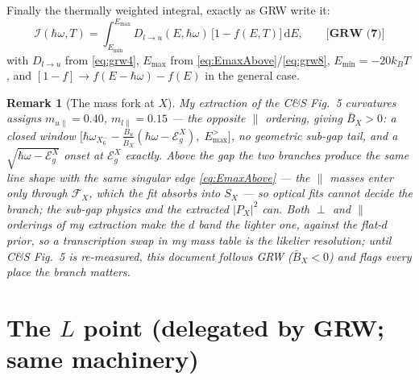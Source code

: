 \documentclass[11pt,a4paper]{article}
\numberwithin{equation}{section}
\newcommand{\hw}{\hbar\omega}
\newcommand{\EgX}{\mathcal{E}_g^{X}}
\newcommand{\cF}{\mathcal{F}}
\newcommand{\cI}{\mathcal{I}}
\newcommand{\BX}{\bar{B}_X}
\newcommand{\dd}{\mathrm{d}}
\newcommand{\wXsix}{\hbar\omega_{X_6^-}}
\newcommand{\grweq}[1]{\textbf{[GRW~(#1)]}}
\newtheorem{remark}{Remark}[section]
\begin{document}
Finally the thermally weighted integral, exactly as GRW write it:
\begin{equation}
\cI(\hw,T)=\int_{E_{\min}}^{E_{\max}}
D_{l\to u}(E,\hw)\,\bigl[1-f(E,T)\bigr]\,\dd E ,
\qquad\grweq{7}
\label{eq:grw7}
\end{equation}
with $D_{l\to u}$ from \eqref{eq:grw4}, $E_{\max}$ from
\eqref{eq:EmaxAbove}/\eqref{eq:grw8}, $E_{\min}=-20k_BT$, and
$[1-f]\to f(E-\hw)-f(E)$ in the general case.

\begin{remark}[The mass fork at $X$]\label{rem:massfork}
My extraction of the C\&S Fig.~5 curvatures assigns
$m_{u\parallel}=0.40$, $m_{l\parallel}=0.15$ --- the \emph{opposite}
$\parallel$ ordering, giving $\BX>0$: a closed window
$\bigl[\wXsix-\tfrac{B_u}{\BX}(\hw-\EgX),\;E_{\max}^{>}\bigr]$,
no geometric sub-gap tail, and a $\sqrt{\hw-\EgX}$ onset at
$\EgX$ exactly.  Above the gap the two branches produce the
\emph{same} line shape with the same singular edge
\eqref{eq:EmaxAbove} --- the $\parallel$ masses enter only through
$\cF_X$, which the fit absorbs into $S_X$ --- so optical fits cannot
decide the branch; the sub-gap physics and the extracted $|P_X|^2$
can.  Both $\perp$ and $\parallel$ orderings of my extraction make
the $d$ band the \emph{lighter} one, against the flat-$d$ prior, so
a transcription swap in my mass table is the likelier resolution;
until C\&S Fig.~5 is re-measured, this document follows GRW
($\BX<0$) and flags every place the branch matters.
\end{remark}

\section{The $L$ point (delegated by GRW; same machinery)}\label{sec:L}
\end{document}
